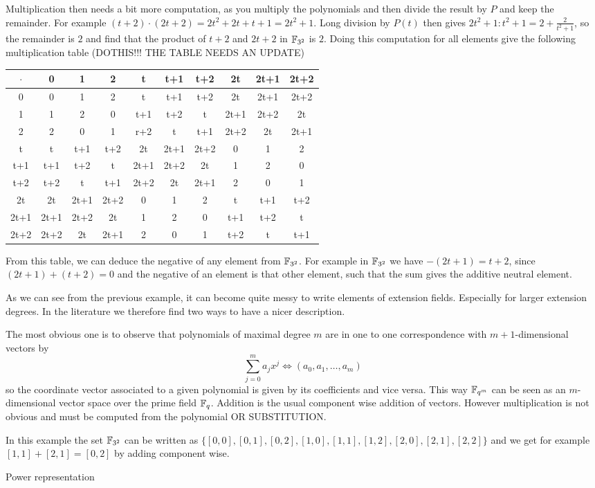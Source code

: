 \begin{example}
Multiplication then needs a bit more computation, as you multiply the polynomials and then divide the result by $P$ and keep the remainder. For example 
$(t+2) \cdot (2t+2)= 2t^2 + 2t + t + 1 = 2t^2+1$. Long division by $P(t)$ then gives $2t^2+1:t^2+1= 2 + \frac{2}{t^2+1}$, so the remainder is $2$ and find that the product of $t+2$ and $2t+2$ in $\mathbb{F}_{3^2}$ is $2$. Doing this computation for all elements give the following multiplication table (DOTHIS!!! THE TABLE NEEDS AN UPDATE)
\begin{center}
  \begin{tabular}{c | c c c c c c c c c}
$\cdot$ & 0    & 1    & 2    & t    & t+1  & t+2  & 2t   & 2t+1 & 2t+2 \\\hline
      0 & 0    & 1    & 2    & t    & t+1  & t+2  & 2t   & 2t+1 & 2t+2 \\
      1 & 1    & 2    & 0    & t+1  & t+2  & t    & 2t+1 & 2t+2 & 2t   \\
      2 & 2    & 0    & 1    & r+2  & t    & t+1  & 2t+2 & 2t   & 2t+1 \\
      t & t    & t+1  & t+2  & 2t   & 2t+1 & 2t+2 & 0    & 1    & 2    \\
    t+1 & t+1  & t+2  & t    & 2t+1 & 2t+2 & 2t   & 1    & 2    & 0    \\
    t+2 & t+2  & t    & t+1  & 2t+2 & 2t   & 2t+1 & 2    & 0    & 1    \\
     2t & 2t   & 2t+1 & 2t+2 & 0    & 1    & 2    & t    & t+1  & t+2  \\
   2t+1 & 2t+1 & 2t+2 & 2t   & 1    & 2    & 0    & t+1  & t+2  & t    \\
   2t+2 & 2t+2 & 2t   & 2t+1 & 2    & 0    & 1    & t+2  & t    & t+1
  \end{tabular}
\end{center}
From this table, we can deduce the negative of any element from $\mathbb{F}_{3^2}$. For example in $\mathbb{F}_{3^2}$ we have $-(2t+1)= t+2$, since $(2t+1) + (t+2)=0$ and the negative of an element is that other element, such that the sum gives the additive neutral element.
\end{example}
As we can see from the previous example, it can become quite messy to write elements of extension fields. Especially for larger extension degrees. In the literature we therefore find two ways to have a nicer description.

The most obvious one is to observe that polynomials of maximal degree $m$ are in one to one correspondence with $m+1$-dimensional vectors by
$$
\sum_{j=0}^m a_j x^j \Leftrightarrow \left(a_0,a_1,\ldots,a_m\right)
$$
so the coordinate vector associated to a given polynomial is given by its coefficients and vice versa. This way $\mathbb{F}_{q^m}$ can be seen as an $m$-dimensional vector space over the prime field $\mathbb{F}_q$. Addition is the usual component wise addition of vectors. However multiplication is not obvious and must be computed from the polynomial OR SUBSTITUTION.

\begin{example}
In this example the set $\mathbb{F}_{3^2}$ can be written as 
$\{[0,0],[0,1],[0,2],[1,0],[1,1],[1,2],[2,0],[2,1],[2,2]\}$ and we get for example $[1,1]+ [2,1]= [0,2]$ by adding component wise. 
\end{example}

Power representation
